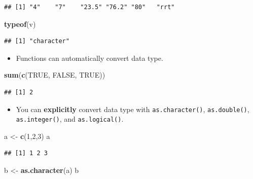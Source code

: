 \documentclass[]{book}
\newenvironment{Shaded}{\begin{snugshade}}{\end{snugshade}}
\newcommand{\DecValTok}[1]{\textcolor[rgb]{0.00,0.00,0.81}{#1}}
\newcommand{\KeywordTok}[1]{\textcolor[rgb]{0.13,0.29,0.53}{\textbf{#1}}}
\newcommand{\NormalTok}[1]{#1}
\newcommand{\OtherTok}[1]{\textcolor[rgb]{0.56,0.35,0.01}{#1}}
\newcommand{\StringTok}[1]{\textcolor[rgb]{0.31,0.60,0.02}{#1}}
\providecommand{\tightlist}{%
  \setlength{\itemsep}{0pt}\setlength{\parskip}{0pt}}
\begin{document}
\begin{verbatim}
## [1] "4"    "7"    "23.5" "76.2" "80"   "rrt"
\end{verbatim}

\begin{Shaded}
\begin{Highlighting}[]
\KeywordTok{typeof}\NormalTok{(v)}
\end{Highlighting}
\end{Shaded}

\begin{verbatim}
## [1] "character"
\end{verbatim}

\begin{itemize}
\tightlist
\item
  Functions can automatically convert data type.
\end{itemize}

\begin{Shaded}
\begin{Highlighting}[]
\KeywordTok{sum}\NormalTok{(}\KeywordTok{c}\NormalTok{(}\OtherTok{TRUE}\NormalTok{, }\OtherTok{FALSE}\NormalTok{, }\OtherTok{TRUE}\NormalTok{))}
\end{Highlighting}
\end{Shaded}

\begin{verbatim}
## [1] 2
\end{verbatim}

\begin{itemize}
\tightlist
\item
  You can \textbf{explicitly} convert data type with \texttt{as.character()}, \texttt{as.double()}, \texttt{as.integer()}, and \texttt{as.logical()}.
\end{itemize}

\begin{Shaded}
\begin{Highlighting}[]
\NormalTok{a <-}\StringTok{ }\KeywordTok{c}\NormalTok{(}\DecValTok{1}\NormalTok{,}\DecValTok{2}\NormalTok{,}\DecValTok{3}\NormalTok{)}
\NormalTok{a}
\end{Highlighting}
\end{Shaded}

\begin{verbatim}
## [1] 1 2 3
\end{verbatim}

\begin{Shaded}
\begin{Highlighting}[]
\NormalTok{b <-}\StringTok{ }\KeywordTok{as.character}\NormalTok{(a)}
\NormalTok{b}
\end{Highlighting}
\end{Shaded}
\end{document}
